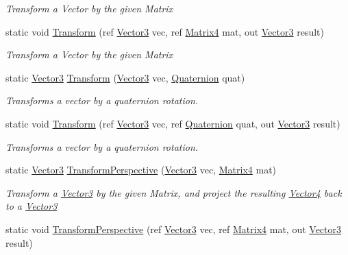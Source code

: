 \begin{DoxyCompactItemize}
\begin{DoxyCompactList}\small\item\em Transform a Vector by the given Matrix\end{DoxyCompactList}\item 
static void \hyperlink{struct_open_t_k_1_1_vector3_a5e688fb4963e41fcfc73fba1a972893d}{Transform} (ref \hyperlink{struct_open_t_k_1_1_vector3}{Vector3} vec, ref \hyperlink{struct_open_t_k_1_1_matrix4}{Matrix4} mat, out \hyperlink{struct_open_t_k_1_1_vector3}{Vector3} result)
\begin{DoxyCompactList}\small\item\em Transform a Vector by the given Matrix\end{DoxyCompactList}\item 
static \hyperlink{struct_open_t_k_1_1_vector3}{Vector3} \hyperlink{struct_open_t_k_1_1_vector3_a76557fb1f8c5dec89e554b4b45149f4f}{Transform} (\hyperlink{struct_open_t_k_1_1_vector3}{Vector3} vec, \hyperlink{struct_open_t_k_1_1_quaternion}{Quaternion} quat)
\begin{DoxyCompactList}\small\item\em Transforms a vector by a quaternion rotation. \end{DoxyCompactList}\item 
static void \hyperlink{struct_open_t_k_1_1_vector3_a07e67d565121be6e9ac465801c6555d4}{Transform} (ref \hyperlink{struct_open_t_k_1_1_vector3}{Vector3} vec, ref \hyperlink{struct_open_t_k_1_1_quaternion}{Quaternion} quat, out \hyperlink{struct_open_t_k_1_1_vector3}{Vector3} result)
\begin{DoxyCompactList}\small\item\em Transforms a vector by a quaternion rotation. \end{DoxyCompactList}\item 
static \hyperlink{struct_open_t_k_1_1_vector3}{Vector3} \hyperlink{struct_open_t_k_1_1_vector3_a45e0617b72aec3511cdf99612312a5ba}{Transform\-Perspective} (\hyperlink{struct_open_t_k_1_1_vector3}{Vector3} vec, \hyperlink{struct_open_t_k_1_1_matrix4}{Matrix4} mat)
\begin{DoxyCompactList}\small\item\em Transform a \hyperlink{struct_open_t_k_1_1_vector3}{Vector3} by the given Matrix, and project the resulting \hyperlink{struct_open_t_k_1_1_vector4}{Vector4} back to a \hyperlink{struct_open_t_k_1_1_vector3}{Vector3}\end{DoxyCompactList}\item 
static void \hyperlink{struct_open_t_k_1_1_vector3_a08e781afbf7d084252edf73a3bc474cb}{Transform\-Perspective} (ref \hyperlink{struct_open_t_k_1_1_vector3}{Vector3} vec, ref \hyperlink{struct_open_t_k_1_1_matrix4}{Matrix4} mat, out \hyperlink{struct_open_t_k_1_1_vector3}{Vector3} result)

\end{DoxyCompactItemize}
